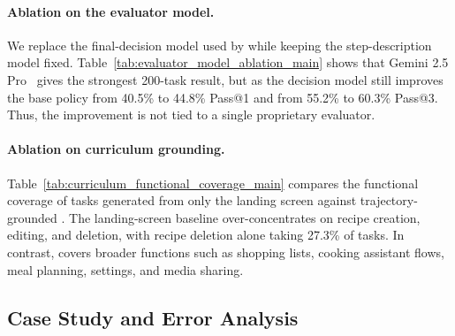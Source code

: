

\paragraph{Ablation on the evaluator model.}
We replace the final-decision model used by \critic while keeping the step-description model fixed. Table~\ref{tab:evaluator_model_ablation_main} shows that Gemini 2.5 Pro~\citep{comanici2025gemini} gives the strongest 200-task result, but  as the decision model still improves the base policy from 40.5\% to 44.8\% Pass@1 and from 55.2\% to 60.3\% Pass@3. Thus, the improvement is not tied to a single proprietary evaluator.



\paragraph{Ablation on curriculum grounding.}
Table~\ref{tab:curriculum_functional_coverage_main} compares the functional coverage of tasks generated from only the landing screen against trajectory-grounded \curriculum. The landing-screen baseline over-concentrates on recipe creation, editing, and deletion, with recipe deletion alone taking 27.3\% of tasks. In contrast, \curriculum covers broader functions such as shopping lists, cooking assistant flows, meal planning, settings, and media sharing.

\subsection{Case Study and Error Analysis}
\label{sec:case_study_error_analysis}



